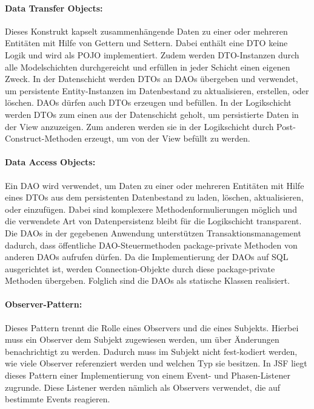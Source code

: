 \documentclass{article}
\begin{document}
\paragraph{Data Transfer Objects:} 
Dieses Konstrukt kapselt zusammenhängende Daten zu einer oder mehreren Entitäten mit Hilfe von Gettern und Settern. Dabei enthält eine DTO keine Logik und wird als POJO implementiert. 
Zudem werden DTO-Instanzen durch alle Modelschichten durchgereicht und erfüllen in jeder Schicht einen eigenen Zweck. 
In der Datenschicht werden DTOs an DAOs übergeben und verwendet, um persistente Entity-Instanzen im Datenbestand zu aktualisieren, erstellen, oder löschen. DAOs dürfen auch DTOs erzeugen und befüllen. 
In der Logikschicht werden DTOs zum einen aus der Datenschicht geholt, um persistierte Daten in der View anzuzeigen. Zum anderen werden sie in der Logikschicht durch Post-Construct-Methoden erzeugt, um von der View befüllt zu werden.

\paragraph{Data Access Objects:} 
Ein DAO wird verwendet, um Daten zu einer oder mehreren Entitäten mit Hilfe eines DTOs aus dem persistenten Datenbestand zu laden, löschen, aktualisieren, oder einzufügen. 
Dabei sind komplexere Methodenformulierungen möglich und die verwendete Art von Datenpersistenz bleibt für die Logikschicht transparent. 
Die DAOs in der gegebenen Anwendung unterstützen Transaktionsmanagement dadurch, dass öffentliche DAO-Steuermethoden package-private Methoden von anderen DAOs aufrufen dürfen. 
Da die Implementierung der DAOs auf SQL ausgerichtet ist, werden Connection-Objekte durch diese package-private Methoden übergeben. Folglich sind die DAOs als statische Klassen realisiert.

\paragraph{Observer-Pattern:} 
Dieses Pattern trennt die Rolle eines Observers und die eines Subjekts. Hierbei muss ein Observer dem Subjekt zugewiesen werden, um über Änderungen benachrichtigt zu werden. 
Dadurch muss im Subjekt nicht fest-kodiert werden, wie viele Observer referenziert werden und welchen Typ sie besitzen. 
In JSF liegt dieses Pattern einer Implementierung von einem Event- und Phasen-Listener zugrunde. Diese Listener werden nämlich als Observers verwendet, die auf bestimmte Events reagieren.
\end{document}
